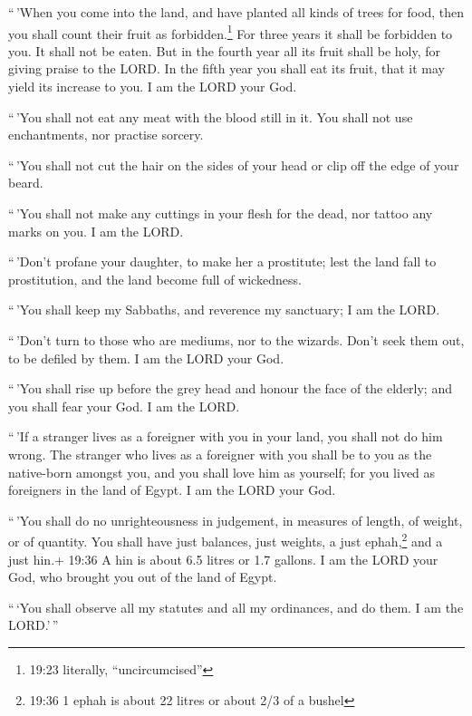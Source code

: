  ``\,'When you come into the land, and have planted all
kinds of trees for food, then you shall count their fruit as
forbidden.\footnote{19:23 literally, ``uncircumcised''} For three years
it shall be forbidden to you. It shall not be eaten.  But
in the fourth year all its fruit shall be holy, for giving praise to the
LORD.  In the fifth year you shall eat its fruit, that it
may yield its increase to you. I am the LORD your God.

 ``\,'You shall not eat any meat with the blood still in
it. You shall not use enchantments, nor practise sorcery.

 ``\,'You shall not cut the hair on the sides of your head
or clip off the edge of your beard.

 ``\,'You shall not make any cuttings in your flesh for the
dead, nor tattoo any marks on you. I am the LORD.

 ``\,'Don't profane your daughter, to make her a
prostitute; lest the land fall to prostitution, and the land become full
of wickedness.

 ``\,'You shall keep my Sabbaths, and reverence my
sanctuary; I am the LORD.

 ``\,'Don't turn to those who are mediums, nor to the
wizards. Don't seek them out, to be defiled by them. I am the LORD your
God.

 ``\,'You shall rise up before the grey head and honour the
face of the elderly; and you shall fear your God. I am the LORD.

 ``\,'If a stranger lives as a foreigner with you in your
land, you shall not do him wrong.  The stranger who lives
as a foreigner with you shall be to you as the native-born amongst you,
and you shall love him as yourself; for you lived as foreigners in the
land of Egypt. I am the LORD your God.

 ``\,'You shall do no unrighteousness in judgement, in
measures of length, of weight, or of quantity.  You shall
have just balances, just weights, a just ephah,\footnote{19:36 1 ephah
  is about 22 litres or about 2/3 of a bushel} and a just hin.+ 19:36 A
hin is about 6.5 litres or 1.7 gallons. I am the LORD your God, who
brought you out of the land of Egypt.

 ``\,`You shall observe all my statutes and all my
ordinances, and do them. I am the LORD.'\,''

